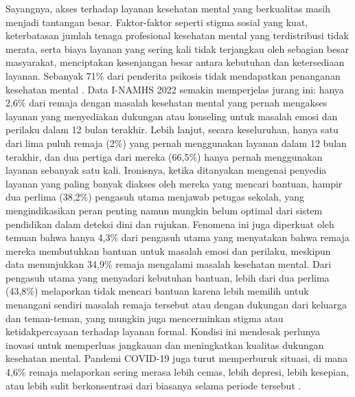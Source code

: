 Sayangnya, akses terhadap layanan kesehatan mental yang berkualitas masih menjadi tantangan besar.
Faktor-faktor seperti stigma sosial yang kuat, keterbatasan jumlah tenaga profesional kesehatan mental yang terdistribusi tidak merata, serta biaya layanan yang sering kali tidak terjangkau oleh sebagian besar masyarakat, menciptakan kesenjangan besar antara kebutuhan dan ketersediaan layanan.
Sebanyak 71\% dari penderita psikosis tidak mendapatkan penanganan kesehatan mental \cite{WHO2022MentalHealth}. Data I-NAMHS 2022 semakin memperjelas jurang ini:
hanya 2,6\% dari remaja dengan masalah kesehatan mental yang pernah mengakses layanan yang menyediakan dukungan atau konseling untuk masalah emosi dan perilaku dalam 12 bulan terakhir.
Lebih lanjut, secara keseluruhan, hanya satu dari lima puluh remaja (2\%) yang pernah menggunakan layanan dalam 12 bulan terakhir, dan dua pertiga dari mereka (66,5\%)
hanya pernah menggunakan layanan sebanyak satu kali. Ironisnya, ketika ditanyakan mengenai penyedia layanan yang paling banyak diakses oleh mereka yang mencari bantuan, hampir dua perlima (38,2\%)
pengasuh utama menjawab petugas sekolah, yang mengindikasikan peran penting namun mungkin belum optimal dari sistem pendidikan dalam deteksi dini dan rujukan. Fenomena ini juga diperkuat oleh temuan bahwa
hanya 4,3\% dari pengasuh utama yang menyatakan bahwa remaja mereka membutuhkan bantuan untuk masalah emosi dan perilaku, meskipun data menunjukkan 34,9\% remaja mengalami masalah kesehatan mental.
Dari pengasuh utama yang menyadari kebutuhan bantuan, lebih dari dua perlima (43,8\%) melaporkan tidak mencari bantuan karena lebih memilih untuk menangani sendiri masalah remaja tersebut atau dengan dukungan
dari keluarga dan teman-teman, yang mungkin juga mencerminkan stigma atau ketidakpercayaan terhadap layanan formal. Kondisi ini mendesak perlunya inovasi untuk memperluas jangkauan dan meningkatkan kualitas dukungan kesehatan mental.
Pandemi COVID-19 juga turut memperburuk situasi, di mana 4,6\% remaja melaporkan sering merasa lebih cemas, lebih depresi, lebih kesepian, atau lebih sulit berkonsentrasi dari biasanya selama periode tersebut \cite{INAMHS2022}.

